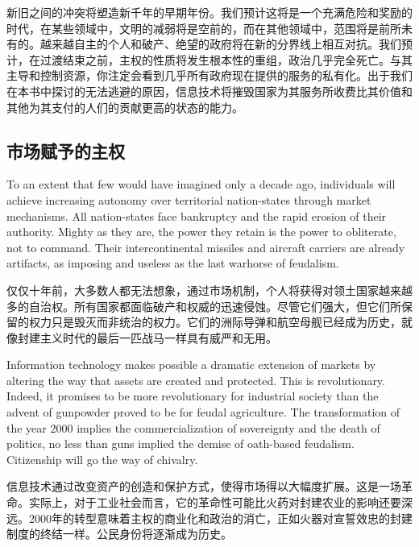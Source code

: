 \begin{Parallel}{97mm}{45mm}
  \ParallelRText
  {\small 新旧之间的冲突将塑造新千年的早期年份。我们预计这将是一个充满危险和奖励的时代，在某些领域中，文明的减弱将是空前的，而在其他领域中，范围将是前所未有的。越来越自主的个人和破产、绝望的政府将在新的分界线上相互对抗。我们预计，在过渡结束之前，主权的性质将发生根本性的重组，政治几乎完全死亡。与其主导和控制资源，你注定会看到几乎所有政府现在提供的服务的私有化。出于我们在本书中探讨的无法逃避的原因，信息技术将摧毁国家为其服务所收费比其价值和其他为其支付的人们的贡献更高的状态的能力。
  }

  \ParallelPar

\subsection{市场赋予的主权}

\ParallelLText
  {To an extent that few would have imagined only a decade ago, individuals will achieve increasing autonomy over territorial nation-states through market mechanisms. All nation-states face bankruptcy and the rapid erosion of their authority. Mighty as they are, the power they retain is the power to obliterate, not to command. Their intercontinental missiles and aircraft carriers are already artifacts, as imposing and useless as the last warhorse of feudalism. }
  
  \ParallelRText
  {\small 仅仅十年前，大多数人都无法想象，通过市场机制，个人将获得对领土国家越来越多的自治权。所有国家都面临破产和权威的迅速侵蚀。尽管它们强大，但它们所保留的权力只是毁灭而非统治的权力。它们的洲际导弹和航空母舰已经成为历史，就像封建主义时代的最后一匹战马一样具有威严和无用。}

  \ParallelPar 
 
  \ParallelLText
  {Information technology makes possible a dramatic extension of markets by altering the way that assets are created and protected. This is revolutionary. Indeed, it promises to be more revolutionary for industrial society than the advent of gunpowder proved to be for feudal agriculture. The transformation of the year 2000 implies the commercialization of sovereignty and the death of politics, no less than guns implied the demise of oath-based feudalism. Citizenship will go the way of chivalry.  }
  
  \ParallelRText
  {\small 信息技术通过改变资产的创造和保护方式，使得市场得以大幅度扩展。这是一场革命。实际上，对于工业社会而言，它的革命性可能比火药对封建农业的影响还要深远。2000年的转型意味着主权的商业化和政治的消亡，正如火器对宣誓效忠的封建制度的终结一样。公民身份将逐渐成为历史。}


\end{Parallel}

